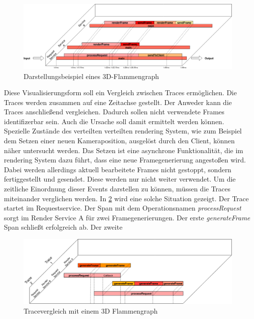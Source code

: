 \begin{figure}[!ht]
	\centering
	\hspace*{-2cm}  
	\includegraphics[scale=0.36]{img/Design/3D-Flammengraph-Konzept.png}
	\caption[Darstellungsbeispiel eines 3D-Flammengraph ]{ Darstellungsbeispiel eines 3D-Flammengraph}
	\label{fig:3D-Flammengraph-Konzept}
\end{figure}

Diese Visualisierungsform soll ein Vergleich zwischen Traces ermöglichen. Die Traces werden zusammen auf eine Zeitachse gestellt. Der Anweder kann die Traces anschließend vergleichen. Dadurch sollen nicht verwendete Frames identifizerbar sein. Auch die Ursache soll damit ermittelt werden können. Spezielle Zustände des verteilten verteilten rendering System, wie zum Beispiel dem Setzen einer neuen Kameraposition, ausgelöst durch den Client, können näher untersucht werden. Das Setzen ist eine asynchrone Funktionalität, die im rendering System dazu führt, dass eine neue Framegenerierung angestoßen wird. Dabei werden allerdings aktuell bearbeitete Frames nicht gestoppt, sondern fertiggestellt und gesendet. Diese werden nur nicht weiter verwendet. Um die zeitliche Einordnung dieser Events darstellen zu können, müssen die Traces miteinander verglichen werden. In \cref{fig:3D-Flammengraph-Vergleich} wird eine solche Situation gezeigt. Der Trace startet im Requestservice. Der Span mit dem Operationsnamen \emph{processRequest} sorgt im Render Service A für zwei Framegenerierungen. Der erste \emph{generateFrame} Span schließt erfolgreich ab. Der zweite 



\begin{figure}[!ht]
	\centering
	\includegraphics[scale=0.4]{img/Design/3D-Flammengraph-Vergleich.png}
	\caption[Darstellungsbeispiel eines Tracevergleich mit einem 3D Flammengraph]{ Tracevergleich mit einem 3D Flammengraph}
	\label{fig:3D-Flammengraph-Vergleich}
\end{figure}

